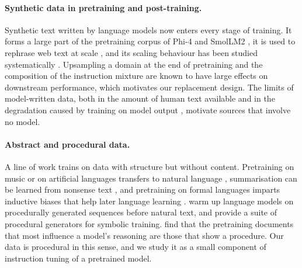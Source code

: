 \documentclass{article}
\begin{document}
\paragraph{Synthetic data in pretraining and post-training.} Synthetic text
written by language models now enters every stage of training. It forms a
large part of the pretraining corpus of Phi-4 \citep{abdin2024phi4} and
SmolLM2 \citep{benallal2025smollm2}, it is used to rephrase web text at scale
\citep{maini2024rephrasing, su2025nemotroncc}, and its scaling behaviour has
been studied systematically \citep{kang2025demystifying}. Upsampling a domain at the end of
pretraining \citep{blakeney2024sparkjoy, liu2025midtraining,
wang2025octothinker} and the composition of the instruction mixture
\citep{lambert2025tulu, olmo2025olmo2} are known to have large effects on
downstream performance, which motivates our replacement design. The limits of
model-written data, both in the amount of human text available
\citep{villalobos2024position} and in the degradation caused by training on
model output \citep{shumailov2024collapse, dohmatob2025strong}, motivate
sources that involve no model.

\paragraph{Abstract and procedural data.} A line of work trains on data with
structure but without content. Pretraining on music or on artificial
languages transfers to natural language \citep{papadimitriou2020music,
chiang2022transferability, wu2022insights}, summarisation can be learned from
nonsense text \citep{krishna2021nonsense}, and pretraining on formal
languages imparts inductive biases that help later language learning
\citep{hu2025circuits}. \citet{jiang2026proceduralpretraining} warm up
language models on procedurally generated sequences before natural text, and
\citet{lacombe2026reasoningcore} provide a suite of procedural generators
for symbolic training. \citet{ruis2025procedural} find that the pretraining
documents that most influence a model's reasoning are those that show a
procedure. Our data is procedural in this sense, and we study it as a small
component of instruction tuning of a pretrained model.
\end{document}
